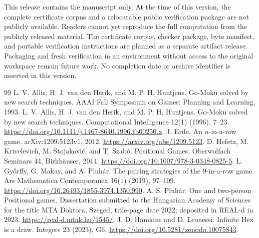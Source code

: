 \documentclass[11pt]{article}
\theoremstyle{definition}
\theoremstyle{remark}
\begin{document}
This release contains the manuscript only. At the time of this version,
the complete certificate corpus and a relocatable public verification
package are not publicly available. Readers cannot yet reproduce the
full computation from the publicly released material. The certificate
corpus, checker package, byte manifest, and portable verification
instructions are planned as a separate artifact release. Packaging and
fresh verification in an environment without access to the original
workspace remain future work. No completion date or archive identifier
is asserted in this version.

\begin{thebibliography}{99}
 L. V. Allis, H. J. van den Herik, and M. P. H. Huntjens.
Go-Moku solved by new search techniques. AAAI Fall Symposium on Games:
Planning and Learning, 1993.
 L. V. Allis, H. J. van den Herik, and M. P. H. Huntjens.
Go-Moku solved by new search techniques. Computational Intelligence
12(1) (1996), 7--23.
\url{https://doi.org/10.1111/j.1467-8640.1996.tb00250.x}.
 J. Erde. An $n$-in-a-row game.
arXiv:1209.5123v1, 2012.
\url{https://arxiv.org/abs/1209.5123}.
 D. Hefetz, M. Krivelevich, M. Stojakovi\'c, and T. Szab\'o.
Positional Games. Oberwolfach Seminars 44, Birkh\"auser, 2014.
\url{https://doi.org/10.1007/978-3-0348-0825-5}.
 L. Gy\H{o}rffy, G. Makay, and A. Pluh\'ar.
The pairing strategies of the 9-in-a-row game.
Ars Mathematica Contemporanea 16(1) (2019), 97--109.
\url{https://doi.org/10.26493/1855-3974.1350.990}.
 A. S. Pluh\'ar. One and two-person Positional games.
Dissertation submitted to the Hungarian Academy of Sciences for the title
MTA Doktora, Szeged, title-page date 2022; deposited in REAL-d in 2023.
\url{https://real-d.mtak.hu/1545/}.
 J. D. Hamkins and D. Leonessi.
Infinite Hex is a draw. Integers 23 (2023), G6.
\url{https://doi.org/10.5281/zenodo.10075843}.
\end{thebibliography}
\end{document}
